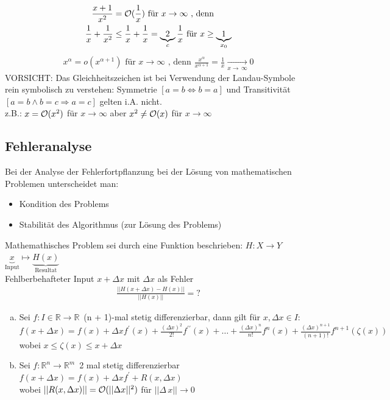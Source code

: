 \begin{align*}
  \frac{x + 1}{x^2} &= \mathcal{O}(\frac{1}{x}) \text{ für } x \to \infty \text{ , denn } \\
  \frac{1}{x} + \frac{1}{x^2} &\leq \frac{1}{x} + \frac{1}{x} = \underbrace{2}_c \frac{1}{x} \text{ für } x \geq \underbrace{1}_{x_0}
\end{align*}
\begin{align*}
  x^{\alpha} = o(x^{\alpha + 1}) \text{ für } x \to \infty \text{ , denn }
  \frac{x^{\alpha}}{x^{\alpha + 1}} = \frac{1}{x} \xrightarrow[x\to\,\infty]{}0
\end{align*}
\textcolor{rot}{VORSICHT}: Das Gleichheitszeichen ist bei Verwendung der Landau-Symbole rein symbolisch
zu verstehen: Symmetrie $[a = b \Leftrightarrow b = a]$ und Transitivität 
$[a = b \wedge b = c \Rightarrow a = c]$ gelten i.A. nicht. \\
z.B.: $x = \mathcal{O}(x^2)$ für $x \to \infty$ aber $x^2 \neq \mathcal{O}(x)$ für $x \to \infty$

\subsection{Fehleranalyse}
Bei der Analyse der Fehlerfortpflanzung bei der Lösung von mathematischen Problemen
unterscheidet man:
\begin{itemize}
  \item Kondition des Problems
  \item Stabilität des Algorithmus (zur Lösung des Problems)
\end{itemize}
Mathemathisches Problem sei durch eine Funktion beschrieben: $H:X \to Y$ \\ 
$\underbrace{x}_{\textrm{Input}} \mapsto \underbrace{H(x)}_{\textrm{Resultat}}$\\
Fehlberbehafteter Input $x + \Delta x$ mit $\Delta x$ als Fehler
\begin{align*}
  \frac{|| H(x + \Delta x) - H(x)||}{|| H(x) ||} = ?
\end{align*}
\begin{enumerate}[(a)]
  \item Sei $f: I \in \mathbb{R} \to \mathbb{R}\,$ (n + 1)-mal stetig differenzierbar, dann gilt für
    $x, \Delta x \in I$: \\
    $f(x + \Delta x) = f(x) + \Delta x f^{\prime}(x) + 
    \frac{(\Delta x)^2}{2!}f^{\prime\prime}(x) + \ldots + 
    \frac{(\Delta x)^n}{n!}f^n(x)+
    \frac{(\Delta x)^{n + 1}}{(n + 1)!}f^{n + 1}(\zeta(x)) $ \\
    wobei $x \leq \zeta(x)\leq x + \Delta x$
  \item Sei $f: \mathbb{R}^n \to \mathbb{R}^m\,$ 2 mal stetig differenzierbar \\
    $f(x + \Delta x) = f(x) + \Delta x f^{\prime} + R(x, \Delta x) $ \\
    wobei $||R(x, \Delta x)|| = \mathcal{O}(||\Delta x||^2)$ für $||\Delta\,x|| \to 0$
\end{enumerate}

